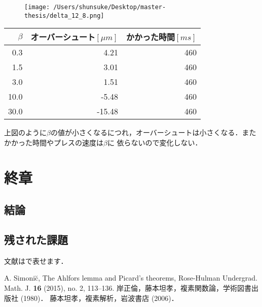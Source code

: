 \documentclass [dvipdfmx] {jsarticle}
\numberwithin{equation}{section}
\theoremstyle{definition} %
\theoremstyle{definition} %
\begin{document}
\begin{figure}[h]
    \begin{center}
    \texttt{[image: /Users/shunsuke/Desktop/master-thesis/delta\_12\_8.png]}
    \caption{}
    \end{center}
\end{figure}

\begin{table}[h]
    \label{table:colortbl2}
    \centering
    \begin{tabular}{|r|r|r|}
     \hline
     $\beta$ & オーバーシュート$[\mu m]$ & かかった時間$[ms]$  \\
     \hline
     0.3 & 4.21 & 460 \\
     1.5 & 3.01 & 460 \\
     3.0 & 1.51 & 460 \\
     10.0 & -5.48 & 460 \\
     30.0 & -15.48 & 460 \\
     \hline
    \end{tabular}
\end{table}
上図のように$\beta$の値が小さくなるにつれ，オーバーシュートは小さくなる．またかかった時間やプレスの速度は$\beta$に
依らないので変化しない．
\section{終章}
\subsection{結論}
\subsection{残された課題}
文献は\cite{Si}で表せます．
\begin{thebibliography}{9}
 A. Simoni\u{c}, The Ahlfors lemma and Picard's theorems, 
Rose-Hulman Undergrad. Math. J. {\bf 16} (2015), no. 2, 113--136. 
 岸正倫，藤本坦孝，複素関数論，学術図書出版社 (1980)．
 藤本坦孝，複素解析，岩波書店 (2006)．


\end{thebibliography}
\end{document}
